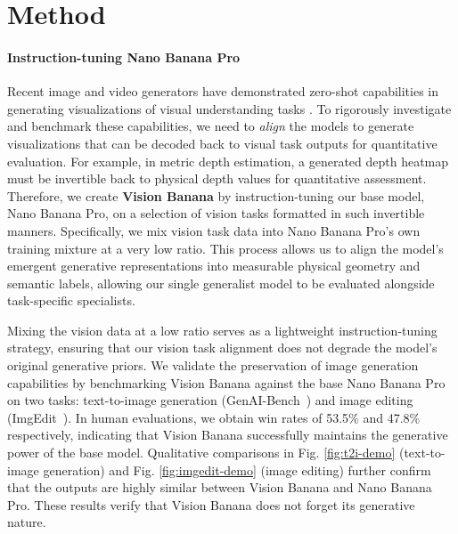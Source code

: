 \documentclass[11pt, a4paper, copyright, gdm]{google}
\begin{document}
\section{Method}

\paragraph{Instruction-tuning Nano Banana Pro}
Recent image and video generators have demonstrated zero-shot capabilities in generating visualizations of visual understanding tasks \citep{wiedemer2025veo_learner,zuo2025nanobanana_low_level}. 
To rigorously investigate and benchmark these capabilities, we need to \textit{align} the models to generate visualizations that can be decoded back to visual task outputs for quantitative evaluation. 
For example, in metric depth estimation, a generated depth heatmap must be invertible back to physical depth values for quantitative assessment. 
Therefore, we create \textbf{Vision Banana} by instruction-tuning our base model, Nano Banana Pro, on a selection of vision tasks formatted in such invertible manners.
Specifically, we mix vision task data into Nano Banana Pro's own training mixture at a very low ratio.
This process allows us to align the model's emergent generative representations into measurable physical geometry and semantic labels, allowing our single generalist model to be evaluated alongside task-specific specialists.


Mixing the vision data at a low ratio serves as a lightweight instruction-tuning strategy, ensuring that our vision task alignment does not degrade the model's original generative priors. 
We validate the preservation of image generation capabilities by benchmarking Vision Banana against the base Nano Banana Pro on two tasks: text-to-image generation (GenAI-Bench~\citep{li2024genaibench}) and image editing (ImgEdit~\citep{ye2025imgedit}).
In human evaluations, we obtain win rates of 53.5\% and 47.8\% respectively, indicating that Vision Banana successfully maintains the generative power of the base model.
Qualitative comparisons in Fig. \ref{fig:t2i-demo} (text-to-image generation) and Fig. \ref{fig:imgedit-demo} (image editing) further confirm that the outputs are highly similar between Vision Banana and Nano Banana Pro.
These results verify that Vision Banana does not forget its generative nature.
\end{document}
